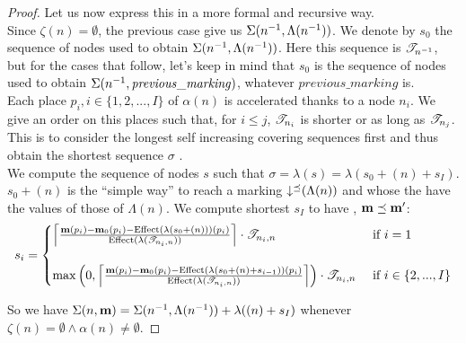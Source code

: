 \begin{proof}
  Let us now express this in a more formal and recursive way.\\
  Since $\zeta(n) = \emptyset$, the previous case give us $\Sigma(n^{-1}, \Lambda(n^{-1}))$.
  We denote by $s_0$ the sequence of nodes used to obtain $\Sigma(n^{-1}, \Lambda(n^{-1}))$.
  Here this sequence is $\mathscr{T}_{n^{-1}}$, but for the cases that follow, let's keep in mind that $s_0$ is the sequence of nodes used to obtain $\Sigma(n^{-1}, \mathit{previous\_marking})$, whatever $\mathit{previous\_marking}$ is.\\
  Each place $p_i, i \in \{1, 2, ..., I\}$ of $\alpha(n)$ is accelerated thanks to a node $n_i$.
  We give an order on this places such that, for $i \leq j$, $\mathscr{T}_{n_i}$ is shorter or as long as $\mathscr{T}_{n_j}$.
  This is to consider the longest self increasing covering sequences first and thus obtain the shortest sequence $\sigma$ .\\
  We compute the sequence of nodes $s$ such that $\sigma = \lambda(s) = \lambda(s_0 + (n) + s_I)$.
  $s_0 + (n)$ is the ``simple way'' to reach a marking $\operatorname{\downarrow^\preceq}(\Lambda(n))$ and whose the \noplaces have the values of those of $\Lambda(n)$.
  We compute shortest $s_I$ to have \marp, $\mathbf{m} \preceq \mathbf{m'}$:
  \[
    s_i =
    \begin{cases}
      \left\lceil
        \frac{\mathbf{m}(p_i) - \mathbf{m}_0(p_i) - \operatorname{Effect}(\lambda(s_0+(n)))(p_i)}
            {\operatorname{Effect}(\lambda(\mathscr{T}_{n_i,n}))}
      \right\rceil
      \cdot \mathscr{T}_{n_i,n}
      &\text{ if } i = 1\\
      \\
      \max\left(0,
        \left\lceil
          \frac{\mathbf{m}(p_i) - \mathbf{m}_0(p_i) - \operatorname{Effect}(\lambda(s_0+(n)+s_{i-1}))(p_i)}
              {\operatorname{Effect}(\lambda(\mathscr{T}_{n_i,n}))}
        \right\rceil
      \right)
      \cdot \mathscr{T}_{n_i,n}
      &\text{ if } i \in \{2, ..., I\}\\
    \end{cases}
  \]

So we have $\Sigma(n, \mathbf{m}) = \Sigma(n^{-1}, \Lambda(n^{-1})) + \lambda((n) + s_I)$ whenever $\zeta(n) = \emptyset \wedge \alpha(n) \neq \emptyset$.






\end{proof}
